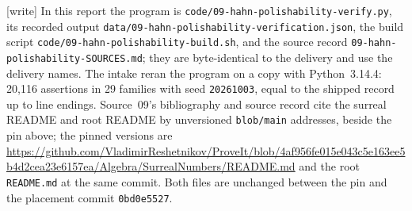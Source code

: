 \documentclass[11pt]{article}
\numberwithin{equation}{section}
\theoremstyle{definition}
\theoremstyle{remark}
\newcommand{\writetag}{\textup{\textsf{\small[write]}}}
\newcommand{\fn}[1]{\nolinkurl{#1}}
\begin{document}
\noindent\writetag{} In this report the program is
\fn{code/09-hahn-polishability-verify.py}, its recorded output
\fn{data/09-hahn-polishability-verification.json}, the build script
\fn{code/09-hahn-polishability-build.sh}, and the source record
\fn{09-hahn-polishability-SOURCES.md}; they are byte-identical to the delivery
and use the delivery names. The intake reran the program on a copy with
Python~3.14.4: 20{,}116 assertions in 29 families with seed
\texttt{20261003}, equal to the shipped record up to line endings. Source~09's
bibliography and source record cite the surreal README and root README by
unversioned \texttt{blob/main} addresses, beside the pin above; the pinned
versions are
\url{https://github.com/VladimirReshetnikov/ProveIt/blob/4af956fe015e043c5e163ee5b4d2cea23e6157ea/Algebra/SurrealNumbers/README.md}
and the root \fn{README.md} at the same commit. Both files are unchanged
between the pin and the placement commit \texttt{0bd0e5527}.
\end{document}
